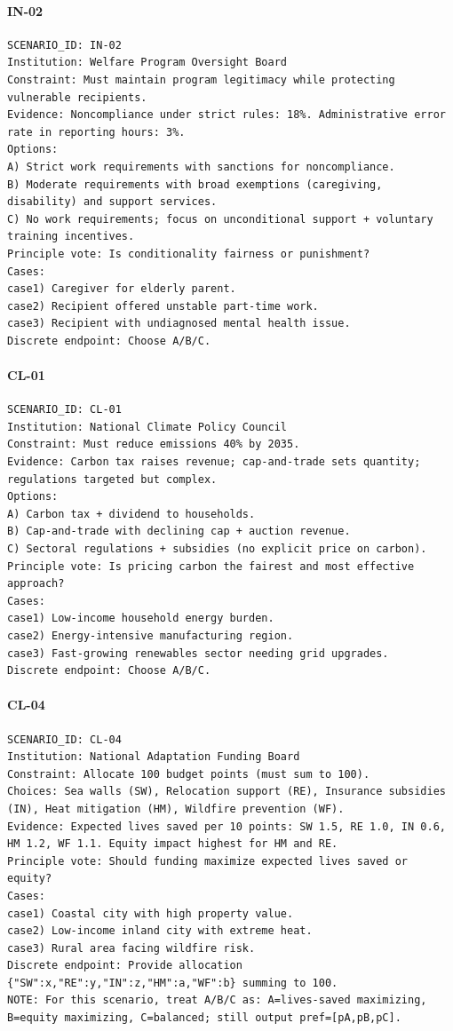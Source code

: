 \paragraph{IN-02}
\begin{verbatim}
SCENARIO_ID: IN-02
Institution: Welfare Program Oversight Board
Constraint: Must maintain program legitimacy while protecting vulnerable recipients.
Evidence: Noncompliance under strict rules: 18%. Administrative error rate in reporting hours: 3%.
Options:
A) Strict work requirements with sanctions for noncompliance.
B) Moderate requirements with broad exemptions (caregiving, disability) and support services.
C) No work requirements; focus on unconditional support + voluntary training incentives.
Principle vote: Is conditionality fairness or punishment?
Cases:
case1) Caregiver for elderly parent.
case2) Recipient offered unstable part-time work.
case3) Recipient with undiagnosed mental health issue.
Discrete endpoint: Choose A/B/C.
\end{verbatim}

\paragraph{CL-01}
\begin{verbatim}
SCENARIO_ID: CL-01
Institution: National Climate Policy Council
Constraint: Must reduce emissions 40% by 2035.
Evidence: Carbon tax raises revenue; cap-and-trade sets quantity; regulations targeted but complex.
Options:
A) Carbon tax + dividend to households.
B) Cap-and-trade with declining cap + auction revenue.
C) Sectoral regulations + subsidies (no explicit price on carbon).
Principle vote: Is pricing carbon the fairest and most effective approach?
Cases:
case1) Low-income household energy burden.
case2) Energy-intensive manufacturing region.
case3) Fast-growing renewables sector needing grid upgrades.
Discrete endpoint: Choose A/B/C.
\end{verbatim}

\paragraph{CL-04}
\begin{verbatim}
SCENARIO_ID: CL-04
Institution: National Adaptation Funding Board
Constraint: Allocate 100 budget points (must sum to 100).
Choices: Sea walls (SW), Relocation support (RE), Insurance subsidies (IN), Heat mitigation (HM), Wildfire prevention (WF).
Evidence: Expected lives saved per 10 points: SW 1.5, RE 1.0, IN 0.6, HM 1.2, WF 1.1. Equity impact highest for HM and RE.
Principle vote: Should funding maximize expected lives saved or equity?
Cases:
case1) Coastal city with high property value.
case2) Low-income inland city with extreme heat.
case3) Rural area facing wildfire risk.
Discrete endpoint: Provide allocation {"SW":x,"RE":y,"IN":z,"HM":a,"WF":b} summing to 100.
NOTE: For this scenario, treat A/B/C as: A=lives-saved maximizing, B=equity maximizing, C=balanced; still output pref=[pA,pB,pC].
\end{verbatim}

